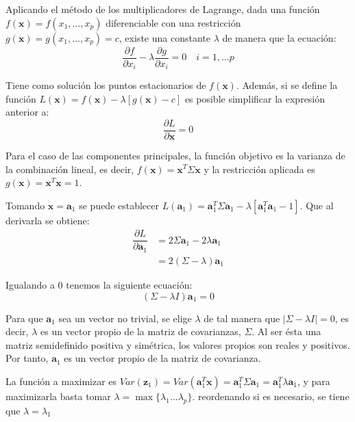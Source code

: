 \noindent Aplicando el método de los multiplicadores de Lagrange,  dada una función $f(\textbf{x})=f(x_1,\ldots, x_p)$ diferenciable con una restricción $g(\textbf{x})=g(x_1, \ldots, x_p)=c$,  existe una constante $\lambda$ de manera que la ecuación:
\begin{equation}
\dfrac{\partial f}{\partial x_i}-\lambda\dfrac{\partial g}{\partial x_i}=0 \quad i=1,\ldots p 
\end{equation}

\noindent Tiene como solución los puntos estacionarios de $f(\textbf{x})$. Además, si se define la función $L(\textbf{x})= f(\textbf{x})-\lambda[g(\textbf{x})-c]$  es posible simplificar la expresión anterior a:
\begin{equation}
\dfrac{\partial L}{\partial \textbf{x}}=0
\end{equation}

\noindent Para el caso de las componentes principales, la función objetivo es la varianza de la combinación lineal, es decir, $f(\textbf{x})=\textbf{x}^T \Sigma \textbf{x}$ y la restricción aplicada es $g(\textbf{x})=\textbf{x}^T\textbf{x}=1$. 

\noindent Tomando $\textbf{x}=\textbf{a}_1$ se puede establecer $L(\textbf{a}_1)=\textbf{a}_1^T \Sigma \textbf{a}_1 - \lambda[\textbf{a}_1^T \textbf{a}_1-1]$. Que al derivarla se obtiene:
\begin{align*}
\dfrac{\partial L}{\partial \textbf{a}_1} &= 2\Sigma \textbf{a}_1 - 2\lambda\textbf{a}_1\\
& = 2(\Sigma-\lambda)\textbf{a}_1 
\end{align*}

\noindent Igualando a 0 tenemos la siguiente ecuación: 
\begin{equation}
(\Sigma-\lambda I)\textbf{a}_1=0
\end{equation}

\noindent Para que $\textbf{a}_1$ sea un vector no trivial, se elige $\lambda$ de tal manera que $|\Sigma-\lambda I| = 0$, es decir, $\lambda$ es un vector propio de la matriz de covarianzas, $\Sigma$. Al ser ésta una matriz semidefinido positiva y simétrica, los valores propios son reales y positivos. Por tanto, $\textbf{a}_1$ es un vector propio de la matriz de covarianza.

\noindent La función a maximizar es $Var(\textbf{z}_1)=Var(\textbf{a}_1^T\textbf{x})=\textbf{a}_1^T\Sigma \textbf{a}_1=\textbf{a}_1^T\lambda \textbf{a}_1$, y para maximizarla basta tomar $\lambda=\max{\lbrace\lambda_1\ldots \lambda_p\rbrace}$. reordenando si es necesario, se tiene que $\lambda=\lambda_1$ 

